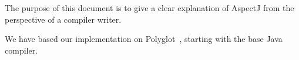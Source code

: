 The purpose of this document is to give a clear explanation of AspectJ
from the perspective of a compiler writer.  

We have based our implementation on Polyglot~\cite{Nystrom:2003:PEC}, 
starting with the base Java compiler.
